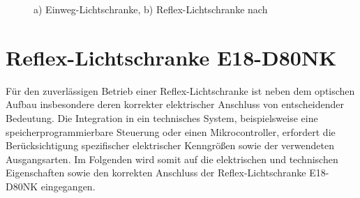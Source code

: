\begin{figure}

	\caption{a) Einweg-Lichtschranke, b) Reflex-Lichtschranke nach \cite{Roddeck:2023}}
	\label{WirkprinzipLS}
\end{figure}



\section{Reflex-Lichtschranke E18-D80NK}
Für den zuverlässigen Betrieb einer Reflex-Lichtschranke ist neben dem optischen Aufbau insbesondere deren korrekter elektrischer Anschluss von entscheidender Bedeutung. Die Integration in ein technisches System, beispielsweise eine speicherprogrammierbare Steuerung oder einen Mikrocontroller, erfordert die Berücksichtigung spezifischer elektrischer Kenngrößen sowie der verwendeten Ausgangsarten. Im Folgenden wird somit auf die elektrischen und technischen Eigenschaften sowie den korrekten  Anschluss der Reflex-Lichtschranke E18-D80NK eingegangen. 
